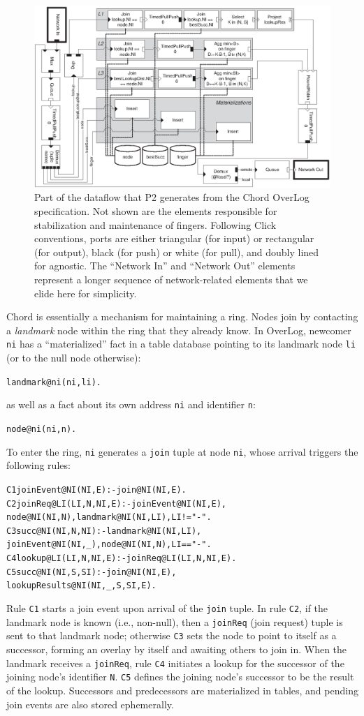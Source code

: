 \documentclass{sig-alt-full}
\def\Sys{P2\xspace}
\def\Lang{OverLog\xspace}
\newcommand{\ol}[1]{{\tt\footnotesize#1}}
\newenvironment{overlog}{\begin{alltt}\small}{\end{alltt}}
\begin{document}
\begin{figure}[th]
\centerline{\includegraphics{florence_2002}}
\caption{Part of the dataflow that \Sys generates from the Chord \Lang
specification.  Not shown are the elements responsible for
stabilization and maintenance of fingers.  Following
Click conventions, ports are either triangular (for input) or
rectangular (for output), black (for push) or white (for pull), and
doubly lined for agnostic.  The ``Network In'' and
``Network Out'' elements represent a longer sequence of network-related
elements that we elide here for simplicity.}
\label{fig:ChordLookup}
\end{figure}

Chord is essentially a mechanism for maintaining a ring.  Nodes join 
by contacting a \emph{landmark} node within the
ring that they already know.  In \Lang, newcomer \ol{ni} has a
``materialized'' fact
in a table database pointing to its landmark node \ol{li} (or to the null
node otherwise): 
\begin{overlog}
landmark@ni(ni,li).
\end{overlog}
as well as a fact about its own address \ol{ni} and identifier \ol{n}:
\begin{overlog}
node@ni(ni,n).
\end{overlog}
To enter the ring, \ol{ni} generates a \ol{join}
tuple at node \ol{ni}, whose arrival triggers the
following rules:
\begin{overlog}
C1 joinEvent@NI(NI,E) :- join@NI(NI,E).
C2 joinReq@LI(LI,N,NI,E) :- joinEvent@NI(NI,E),
  node@NI(NI,N), landmark@NI(NI,LI), LI != "-".
C3 succ@NI(NI,N,NI) :- landmark@NI(NI,LI),
  joinEvent@NI(NI,_), node@NI(NI,N), LI == "-".
C4 lookup@LI(LI,N,NI,E) :- joinReq@LI(LI,N,NI,E).
C5 succ@NI(NI,S,SI) :- join@NI(NI,E),
  lookupResults@NI(NI,_,S,SI,E).
\end{overlog}
Rule \ol{C1} starts a join event upon arrival of
the \ol{join} tuple.  In rule \ol{C2}, if the
landmark node is known (i.e., non-null), then a
\ol{joinReq} (join request) tuple is sent to that landmark node;
otherwise \ol{C3} sets the node to point to itself
as a successor, forming an overlay by itself and
awaiting others to join in.  When the landmark
receives a \ol{joinReq}, rule \ol{C4} initiates a
lookup for the successor of the joining node's identifier
\ol{N}.  \ol{C5} defines the joining node's successor to be
the result of the lookup. Successors and
predecessors are materialized in tables, and
pending join events are also stored ephemerally.
\end{document}

